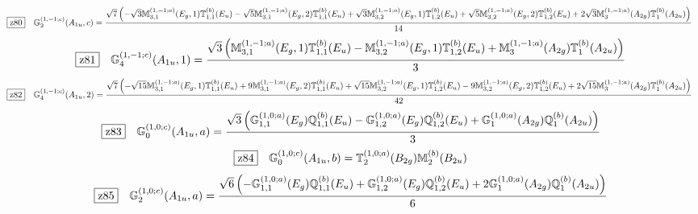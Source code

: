 \documentclass[fleqn,10pt,landscape]{jsarticle}
\begin{document}
\begin{dmath*}
\hspace*{3mm}\fbox{z80}\quad \mathbb{G}_{2}^{(1,-1;c)}(A_{1u},c)=\frac{\sqrt{7} \left(- \sqrt{3} \mathbb{M}_{3,1}^{(1,-1;a)}(E_{g},1) \mathbb{T}_{1,1}^{(b)}(E_{u}) - \sqrt{5} \mathbb{M}_{3,1}^{(1,-1;a)}(E_{g},2) \mathbb{T}_{1,1}^{(b)}(E_{u}) + \sqrt{3} \mathbb{M}_{3,2}^{(1,-1;a)}(E_{g},1) \mathbb{T}_{1,2}^{(b)}(E_{u}) + \sqrt{5} \mathbb{M}_{3,2}^{(1,-1;a)}(E_{g},2) \mathbb{T}_{1,2}^{(b)}(E_{u}) + 2 \sqrt{3} \mathbb{M}_{3}^{(1,-1;a)}(A_{2g}) \mathbb{T}_{1}^{(b)}(A_{2u})\right)}{14}
\end{dmath*}
\begin{dmath*}
\hspace*{3mm}\fbox{z81}\quad \mathbb{G}_{4}^{(1,-1;c)}(A_{1u},1)=\frac{\sqrt{3} \left(\mathbb{M}_{3,1}^{(1,-1;a)}(E_{g},1) \mathbb{T}_{1,1}^{(b)}(E_{u}) - \mathbb{M}_{3,2}^{(1,-1;a)}(E_{g},1) \mathbb{T}_{1,2}^{(b)}(E_{u}) + \mathbb{M}_{3}^{(1,-1;a)}(A_{2g}) \mathbb{T}_{1}^{(b)}(A_{2u})\right)}{3}
\end{dmath*}
\begin{dmath*}
\hspace*{3mm}\fbox{z82}\quad \mathbb{G}_{4}^{(1,-1;c)}(A_{1u},2)=\frac{\sqrt{7} \left(- \sqrt{15} \mathbb{M}_{3,1}^{(1,-1;a)}(E_{g},1) \mathbb{T}_{1,1}^{(b)}(E_{u}) + 9 \mathbb{M}_{3,1}^{(1,-1;a)}(E_{g},2) \mathbb{T}_{1,1}^{(b)}(E_{u}) + \sqrt{15} \mathbb{M}_{3,2}^{(1,-1;a)}(E_{g},1) \mathbb{T}_{1,2}^{(b)}(E_{u}) - 9 \mathbb{M}_{3,2}^{(1,-1;a)}(E_{g},2) \mathbb{T}_{1,2}^{(b)}(E_{u}) + 2 \sqrt{15} \mathbb{M}_{3}^{(1,-1;a)}(A_{2g}) \mathbb{T}_{1}^{(b)}(A_{2u})\right)}{42}
\end{dmath*}
\begin{dmath*}
\hspace*{3mm}\fbox{z83}\quad \mathbb{G}_{0}^{(1,0;c)}(A_{1u},a)=\frac{\sqrt{3} \left(\mathbb{G}_{1,1}^{(1,0;a)}(E_{g}) \mathbb{Q}_{1,1}^{(b)}(E_{u}) - \mathbb{G}_{1,2}^{(1,0;a)}(E_{g}) \mathbb{Q}_{1,2}^{(b)}(E_{u}) + \mathbb{G}_{1}^{(1,0;a)}(A_{2g}) \mathbb{Q}_{1}^{(b)}(A_{2u})\right)}{3}
\end{dmath*}
\begin{dmath*}
\hspace*{3mm}\fbox{z84}\quad \mathbb{G}_{0}^{(1,0;c)}(A_{1u},b)=\mathbb{T}_{2}^{(1,0;a)}(B_{2g}) \mathbb{M}_{2}^{(b)}(B_{2u})
\end{dmath*}
\begin{dmath*}
\hspace*{3mm}\fbox{z85}\quad \mathbb{G}_{2}^{(1,0;c)}(A_{1u},a)=\frac{\sqrt{6} \left(- \mathbb{G}_{1,1}^{(1,0;a)}(E_{g}) \mathbb{Q}_{1,1}^{(b)}(E_{u}) + \mathbb{G}_{1,2}^{(1,0;a)}(E_{g}) \mathbb{Q}_{1,2}^{(b)}(E_{u}) + 2 \mathbb{G}_{1}^{(1,0;a)}(A_{2g}) \mathbb{Q}_{1}^{(b)}(A_{2u})\right)}{6}
\end{dmath*}
\end{document}
